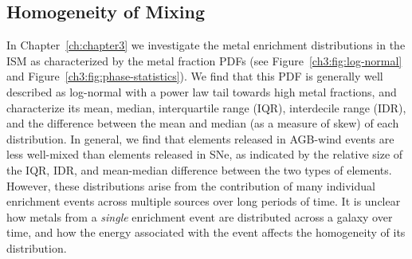 \subsection{Homogeneity of Mixing}
\label{ch4:sec:spreads}

In Chapter~\ref{ch:chapter3} we investigate the metal enrichment distributions in the ISM as characterized by the metal fraction PDFs (see Figure~\ref{ch3:fig:log-normal} and Figure~\ref{ch3:fig:phase-statistics}). We find that this PDF is generally well described as log-normal with a power law tail towards high metal fractions, and characterize its mean, median, interquartile range (IQR), interdecile range (IDR), and the difference between the mean and median (as a measure of skew) of each distribution. In general, we find that elements released in AGB-wind events are less well-mixed than elements released in SNe, as indicated by the relative size of the IQR, IDR, and mean-median difference between the two types of elements. However, these distributions arise from the contribution of many individual enrichment events across multiple sources over long periods of time. It is unclear how metals from a \textit{single} enrichment event are distributed across a galaxy over time, and how the energy associated with the event affects the homogeneity of its distribution.

